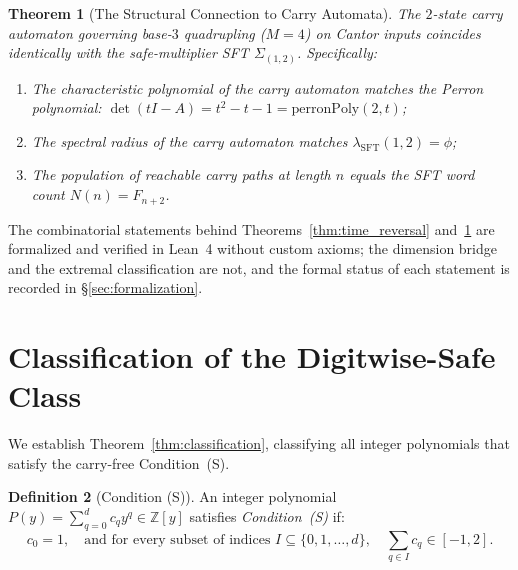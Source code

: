 \documentclass[11pt,reqno]{amsart}
\theoremstyle{plain}
\newtheorem{theorem}{Theorem}[section]
\theoremstyle{definition}
\newtheorem{definition}[theorem]{Definition}
\theoremstyle{remark}
\newcommand{\Z}{\mathbb{Z}}
\begin{document}
\begin{theorem}[The Structural Connection to Carry Automata]\label{thm:connection_lemma}
The $2$-state carry automaton governing base-$3$ quadrupling ($M = 4$) on Cantor inputs coincides identically with the safe-multiplier SFT $\Sigma_{(1, 2)}$. Specifically:
\begin{enumerate}
    \item The characteristic polynomial of the carry automaton matches the Perron polynomial: $\det(t I - A) = t^2 - t - 1 = \mathrm{perronPoly}(2, t)$;
    \item The spectral radius of the carry automaton matches $\lambda_{\mathrm{SFT}}(1, 2) = \phi$;
    \item The population of reachable carry paths at length $n$ equals the SFT word count $N(n) = F_{n+2}$.
\end{enumerate}
\end{theorem}

The combinatorial statements behind Theorems~\ref{thm:time_reversal} and~\ref{thm:connection_lemma} are formalized and verified in Lean~4 without custom axioms; the dimension bridge and the extremal classification are not, and the formal status of each statement is recorded in \S\ref{sec:formalization}.

\section{Classification of the Digitwise-Safe Class}\label{sec:classification}

We establish Theorem~\ref{thm:classification}, classifying all integer polynomials that satisfy the carry-free Condition~(S).

\begin{definition}[Condition (S)]\label{def:condition_s}
An integer polynomial $P(y) = \sum_{q=0}^d c_q y^q \in \Z[y]$ satisfies \emph{Condition~(S)} if:
\begin{equation}
c_0 = 1, \quad \text{and for every subset of indices } I \subseteq \{0, 1, \dots, d\}, \quad \sum_{q \in I} c_q \in [-1, 2].
\end{equation}
\end{definition}
\end{document}
